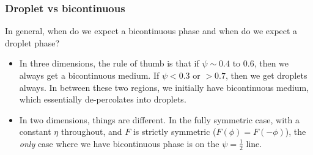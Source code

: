 \documentclass[a4paper]{article}
\begin{document}
\subsubsection*{Droplet vs bicontinuous}
In general, when do we expect a bicontinuous phase and when do we expect a droplet phase?
%
%
%

\begin{itemize}
  \item In three dimensions, the rule of thumb is that if $\psi \sim 0.4 \text{ to }0.6$, then we always get a bicontinuous medium. If $\psi < 0.3$ or $>0.7$, then we get droplets always. In between these two regions, we initially have bicontinuous medium, which essentially de-percolates into droplets.
  \item In two dimensions, things are different. In the fully symmetric case, with a constant $\eta$ throughout, and $F$ is strictly symmetric ($F(\phi) = F(-\phi)$), the \emph{only} case where we have bicontinuous phase is on the $\psi = \frac{1}{2}$ line.
\end{itemize}

\end{document}

